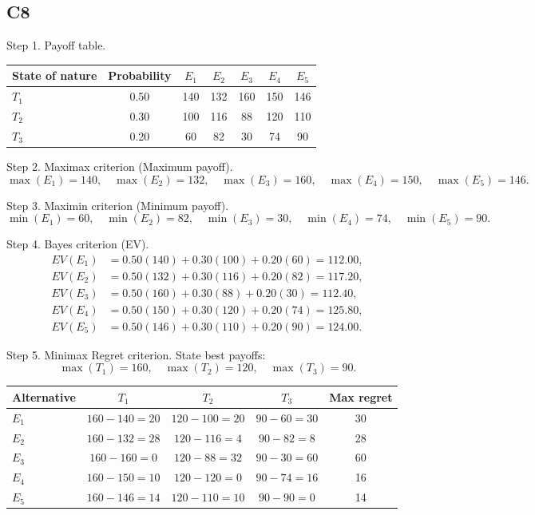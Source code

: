 \begin{ExamProblems}
		\subsection*{C8}
		Step 1. Payoff table.
		\begin{center}
			\begin{tabular}{l c c c c c c}
				\toprule
				State of nature & Probability & $E_1$ & $E_2$ & $E_3$ & $E_4$ & $E_5$ \\
				\midrule
				$T_1$ & 0.50 & 140 & 132 & 160 & 150 & 146 \\
				$T_2$ & 0.30 & 100 & 116 & 88 & 120 & 110 \\
				$T_3$ & 0.20 & 60 & 82 & 30 & 74 & 90 \\
				\bottomrule
			\end{tabular}
		\end{center}

		Step 2. Maximax criterion (Maximum payoff).
		\[
		\max(E_1)=140,\quad \max(E_2)=132,\quad \max(E_3)=160,\quad \max(E_4)=150,\quad \max(E_5)=146.
		\]

		Step 3. Maximin criterion (Minimum payoff).
		\[
		\min(E_1)=60,\quad \min(E_2)=82,\quad \min(E_3)=30,\quad \min(E_4)=74,\quad \min(E_5)=90.
		\]

		Step 4. Bayes criterion (EV).
		\[
		\begin{aligned}
		EV(E_1)&=0.50(140)+0.30(100)+0.20(60)=112.00,\\
		EV(E_2)&=0.50(132)+0.30(116)+0.20(82)=117.20,\\
		EV(E_3)&=0.50(160)+0.30(88)+0.20(30)=112.40,\\
		EV(E_4)&=0.50(150)+0.30(120)+0.20(74)=125.80,\\
		EV(E_5)&=0.50(146)+0.30(110)+0.20(90)=124.00.
		\end{aligned}
		\]

		Step 5. Minimax Regret criterion.
		State best payoffs:
		\[
		\max(T_1)=160,\quad \max(T_2)=120,\quad \max(T_3)=90.
		\]
		\begin{center}
			\begin{tabular}{l c c c c}
				\toprule
				Alternative & $T_1$ & $T_2$ & $T_3$ & Max regret \\
				\midrule
				$E_1$ & $160-140=20$ & $120-100=20$ & $90-60=30$ & 30 \\
				$E_2$ & $160-132=28$ & $120-116=4$ & $90-82=8$ & 28 \\
				$E_3$ & $160-160=0$ & $120-88=32$ & $90-30=60$ & 60 \\
				$E_4$ & $160-150=10$ & $120-120=0$ & $90-74=16$ & 16 \\
				$E_5$ & $160-146=14$ & $120-110=10$ & $90-90=0$ & 14 \\
				\bottomrule
			\end{tabular}
		\end{center}


\end{ExamProblems}
